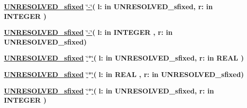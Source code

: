 \begin{DoxyCompactItemize}
\item 
{\bfseries {\bfseries {\bfseries \hyperlink{classfixed__pkg_aa723b28a027c3c0f9bca02d75e8df4d6}{U\+N\+R\+E\+S\+O\+L\+V\+E\+D\+\_\+sfixed}} \textcolor{vhdlchar}{ }}} \hyperlink{classfixed__pkg_ac2f01ba70fd51fb20393648e564e9cf8}{\char`\"{}-\/\char`\"{}}{\bfseries  ( }{\bfseries \textcolor{vhdlchar}{l\+: }\textcolor{stringliteral}{in }\textcolor{vhdlchar}{U\+N\+R\+E\+S\+O\+L\+V\+E\+D\+\_\+sfixed}}{\bfseries  , \textcolor{vhdlchar}{r\+: }\textcolor{stringliteral}{in }{\bfseries \textcolor{comment}{I\+N\+T\+E\+G\+E\+R}\textcolor{vhdlchar}{ }}}{\bfseries  )} 
\item 
{\bfseries {\bfseries {\bfseries \hyperlink{classfixed__pkg_aa723b28a027c3c0f9bca02d75e8df4d6}{U\+N\+R\+E\+S\+O\+L\+V\+E\+D\+\_\+sfixed}} \textcolor{vhdlchar}{ }}} \hyperlink{classfixed__pkg_ac2f01ba70fd51fb20393648e564e9cf8}{\char`\"{}-\/\char`\"{}}{\bfseries  ( }{\bfseries \textcolor{vhdlchar}{l\+: }\textcolor{stringliteral}{in }{\bfseries \textcolor{comment}{I\+N\+T\+E\+G\+E\+R}\textcolor{vhdlchar}{ }}}{\bfseries  , \textcolor{vhdlchar}{r\+: }\textcolor{stringliteral}{in }\textcolor{vhdlchar}{U\+N\+R\+E\+S\+O\+L\+V\+E\+D\+\_\+sfixed}}{\bfseries  )} 
\item 
{\bfseries {\bfseries {\bfseries \hyperlink{classfixed__pkg_aa723b28a027c3c0f9bca02d75e8df4d6}{U\+N\+R\+E\+S\+O\+L\+V\+E\+D\+\_\+sfixed}} \textcolor{vhdlchar}{ }}} \hyperlink{classfixed__pkg_adc75e260eb741edc3aae92fed900c09a}{\char`\"{}$\ast$\char`\"{}}{\bfseries  ( }{\bfseries \textcolor{vhdlchar}{l\+: }\textcolor{stringliteral}{in }\textcolor{vhdlchar}{U\+N\+R\+E\+S\+O\+L\+V\+E\+D\+\_\+sfixed}}{\bfseries  , \textcolor{vhdlchar}{r\+: }\textcolor{stringliteral}{in }{\bfseries \textcolor{comment}{R\+E\+A\+L}\textcolor{vhdlchar}{ }}}{\bfseries  )} 
\item 
{\bfseries {\bfseries {\bfseries \hyperlink{classfixed__pkg_aa723b28a027c3c0f9bca02d75e8df4d6}{U\+N\+R\+E\+S\+O\+L\+V\+E\+D\+\_\+sfixed}} \textcolor{vhdlchar}{ }}} \hyperlink{classfixed__pkg_adc75e260eb741edc3aae92fed900c09a}{\char`\"{}$\ast$\char`\"{}}{\bfseries  ( }{\bfseries \textcolor{vhdlchar}{l\+: }\textcolor{stringliteral}{in }{\bfseries \textcolor{comment}{R\+E\+A\+L}\textcolor{vhdlchar}{ }}}{\bfseries  , \textcolor{vhdlchar}{r\+: }\textcolor{stringliteral}{in }\textcolor{vhdlchar}{U\+N\+R\+E\+S\+O\+L\+V\+E\+D\+\_\+sfixed}}{\bfseries  )} 
\item 
{\bfseries {\bfseries {\bfseries \hyperlink{classfixed__pkg_aa723b28a027c3c0f9bca02d75e8df4d6}{U\+N\+R\+E\+S\+O\+L\+V\+E\+D\+\_\+sfixed}} \textcolor{vhdlchar}{ }}} \hyperlink{classfixed__pkg_adc75e260eb741edc3aae92fed900c09a}{\char`\"{}$\ast$\char`\"{}}{\bfseries  ( }{\bfseries \textcolor{vhdlchar}{l\+: }\textcolor{stringliteral}{in }\textcolor{vhdlchar}{U\+N\+R\+E\+S\+O\+L\+V\+E\+D\+\_\+sfixed}}{\bfseries  , \textcolor{vhdlchar}{r\+: }\textcolor{stringliteral}{in }{\bfseries \textcolor{comment}{I\+N\+T\+E\+G\+E\+R}\textcolor{vhdlchar}{ }}}{\bfseries  )} 

\end{DoxyCompactItemize}
